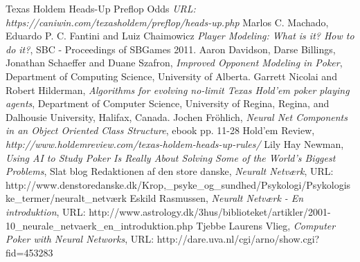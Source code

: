 \begin{thebibliography}{100} 
 Texas Holdem Heads-Up Preflop Odds 
\emph{URL: https://caniwin.com/texasholdem/preflop/heads-up.php}
 Marlos C. Machado, Eduardo P. C. Fantini and Luiz Chaimowicz \emph{Player Modeling: What is it? How to do it?}, SBC - Proceedings of SBGames 2011.
 Aaron Davidson, Darse Billings, Jonathan Schaeffer and Duane Szafron, \emph{Improved Opponent Modeling in Poker},
Department of Computing Science, University of Alberta.
 Garrett Nicolai and Robert Hilderman, \emph{Algorithms for evolving no-limit Texas Hold'em poker playing agents}, Department of Computer Science, University of Regina, Regina, and Dalhousie University, Halifax, Canada.
 Jochen Fröhlich, \emph {Neural Net Components in an Object Oriented Class Structure}, 
ebook pp. 11-28
 Hold'em Review, \emph {http://www.holdemreview.com/texas-holdem-heads-up-rules/}
 Lily Hay Newman, \emph{Using AI to Study Poker Is Really About Solving Some of the World’s Biggest Problems}, 
Slat blog
 Redaktionen af den store danske, \emph{Neuralt Netværk}, URL: http://www.denstoredanske.dk/Krop,_psyke_og_sundhed/Psykologi/Psykologiske_termer/neuralt_netværk
 Eskild Rasmussen, \emph {Neuralt Netværk - En introduktion}, URL: http://www.astrology.dk/3hus/biblioteket/artikler/2001-10_neurale_netvaerk_en_introduktion.php
 Tjebbe Laurens Vlieg, \emph {Computer Poker with Neural Networks}, URL: http://dare.uva.nl/cgi/arno/show.cgi?fid=453283


\end{thebibliography}
